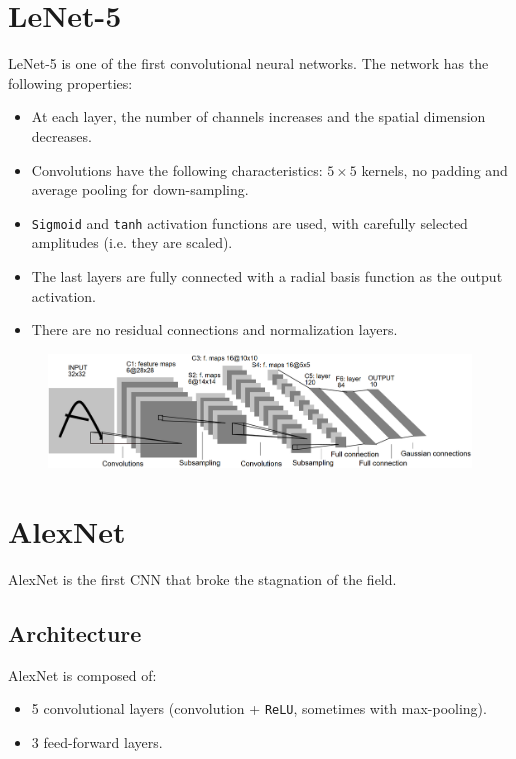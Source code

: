 \section{LeNet-5}

LeNet-5 is one of the first convolutional neural networks.
The network has the following properties:
\begin{itemize}
    \item At each layer, the number of channels increases and the spatial dimension decreases.
    \item Convolutions have the following characteristics: $5 \times 5$ kernels, no padding and average pooling for down-sampling.
    \item \texttt{Sigmoid} and \texttt{tanh} activation functions are used, with carefully selected amplitudes (i.e. they are scaled).
    \item The last layers are fully connected with a radial basis function as the output activation.
    \item There are no residual connections and normalization layers.
\end{itemize}

\begin{figure}[H]
    \centering
    \includegraphics[width=0.8\linewidth]{./img/lenet5.png}
\end{figure}



\section{AlexNet}

AlexNet is the first CNN that broke the stagnation of the field.


\subsection{Architecture}

AlexNet is composed of:
\begin{itemize}
    \item 5 convolutional layers (convolution + \texttt{ReLU}, sometimes with max-pooling).
    \item 3 feed-forward layers.
\end{itemize}

